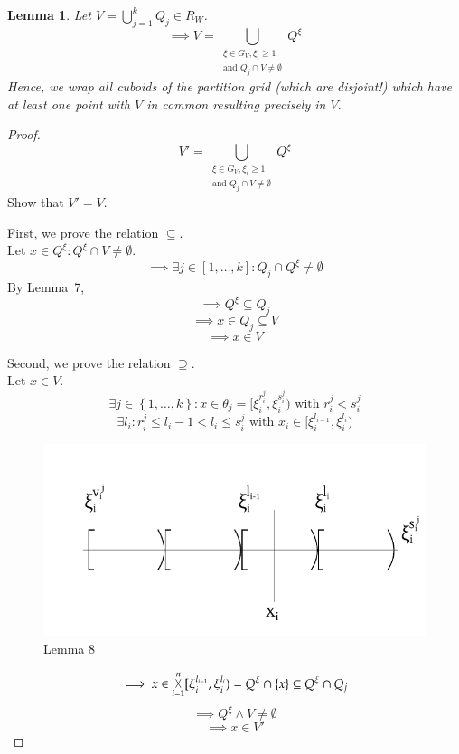 \documentclass{article}
\newtheorem{lemma}{Lemma}  \numberwithin{lemma}{section}
\newcommand{\set}[1]{\left\{#1\right\}}
\DeclareMathOperator*{\bigtimes}{\vartimes}
\begin{document}
\begin{lemma}
  \label{l:eight}
  Let $V = \bigcup_{j=1}^{k} Q_j \in R_W$.
  \[ \implies V = \bigcup_{\substack{\xi \in G_V, \xi_i \geq 1 \\ \text{and } Q_j \cap V \neq \emptyset}} Q^\xi \]
  Hence, we wrap all cuboids of the partition grid (which are disjoint!)
  which have at least one point with $V$ in common resulting precisely in $V$.
\end{lemma}
\begin{proof}
  \[ V' = \bigcup_{\substack{\xi \in G_V, \xi_i \geq 1 \\ \text{and } Q_j \cap V \neq \emptyset}} Q^\xi \]
  Show that $V' = V$.

  First, we prove the relation $\subseteq$. \\
  Let $x \in Q^\xi: Q^\xi \cap V \neq \emptyset$.
  \[ \implies \exists j \in [1,\ldots,k]: Q_j \cap Q^\xi \neq \emptyset \]
  By Lemma~7,
  \[ \implies Q^\xi \subseteq Q_j \]
  \[ \implies x \in Q_j \subseteq V \]
  \[ \implies x \in V \]

  Second, we prove the relation $\supseteq$. \\
  Let $x \in V$.
  \[ \exists j \in \set{1,\ldots,k}: x \in \theta_j = [\xi_i^{r_i^j}, \xi_i^{s_i^j}) \text{ with } r_i^j < s_i^j \]
  \[ \exists l_i: r_i^j \leq l_i - 1 < l_i \leq s_i^j \text{ with } x_i \in [\xi_{i}^{l_{i-1}}, \xi_i^{l_i}) \]

  \begin{figure}[!h]
    \begin{center}
      \includegraphics{img/08_lemma8.pdf}
      \caption{Lemma 8}
    \end{center}
  \end{figure}

  \[ \implies x \in \bigtimes_{i=1}^{n} [\xi_i^{l_{i-1}}, \xi_i^{l_i}) = Q^\xi \cap \set{x} \subseteq Q^\xi \cap Q_j \]
  \[ \implies Q^\xi \land V \neq \emptyset \]
  \[ \implies x \in V' \]
\end{proof}
\end{document}
